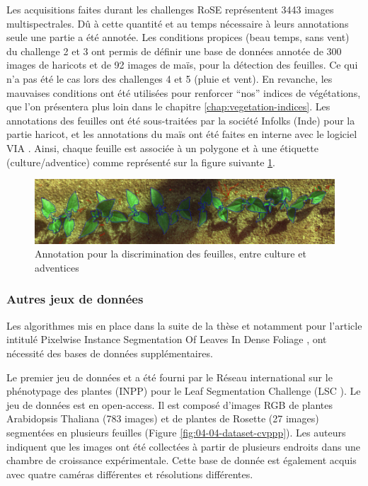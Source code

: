 \documentclass[../thesis.tex]{subfiles}
\begin{document}
    Les acquisitions faites durant les challenges RoSE représentent 3443 images multispectrales. Dû à cette quantité et au temps nécessaire à leurs annotations seule une partie a été annotée. Les conditions propices (beau temps, sans vent) du challenge 2 et 3 ont permis de définir une base de données annotée de 300 images de haricots et de 92 images de maïs, pour la détection des feuilles. Ce qui n'a pas été le cas lors des challenges 4 et 5 (pluie et vent). En revanche, les mauvaises conditions ont été utilisées pour renforcer ``nos'' indices de végétations, que l'on présentera plus loin dans le chapitre \ref{chap:vegetation-indices}. Les annotations des feuilles ont été sous-traitées par la société Infolks (Inde) pour la partie haricot, et les annotations du maïs ont été faites en interne avec le logiciel VIA \cite{dutta2019vgg}. Ainsi, chaque feuille est associée à un polygone et à une étiquette (culture/adventice) comme représenté sur la figure suivante \ref{fig:04-mat-dataset-body}.
    
    \begin{figure}[H]
        \centering
        \includegraphics[width=\linewidth]{img/material/rose-gt-infolk}
        \caption{Annotation pour la discrimination des feuilles, entre culture et adventices}
        \label{fig:04-mat-dataset-body}
    \end{figure}
    
    \newpage
    
    \subsubsection{Autres jeux de données}
    
    \vspace{1em}
    Les algorithmes mis en place dans la suite de la thèse et notamment pour l'article intitulé \og Pixelwise Instance Segmentation Of Leaves In Dense Foliage \fg, ont nécessité des bases de données supplémentaires.
    
    Le premier jeu de données et a été fourni par le Réseau international sur le phénotypage des plantes (INPP) pour le Leaf Segmentation Challenge (LSC \cite{scharr2017computer}). Le jeu de données est en open-access. Il est composé d'images RGB de plantes Arabidopsis Thaliana (783 images) et de plantes de Rosette (27 images) segmentées en plusieurs feuilles (Figure \ref{fig:04-04-dataset-cvppp}). Les auteurs indiquent que les images ont été collectées à partir de plusieurs endroits dans une chambre de croissance expérimentale. Cette base de donnée est également acquis avec quatre caméras différentes et résolutions différentes.
    
\end{document}
